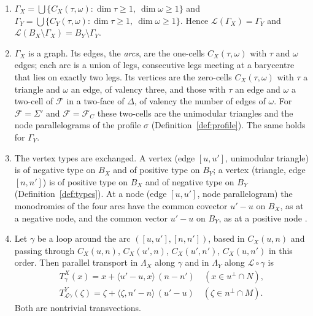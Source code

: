\begin{proposition}\label{prop:L2}
\begin{enumerate}
\item $\Gamma_X=\bigcup\{C_X(\tau,\omega):\dim\tau\ge1,\ \dim\omega\ge1\}$ and
$\Gamma_Y=\bigcup\{C_Y(\tau,\omega):\dim\tau\ge1,\ \dim\omega\ge1\}$. Hence $\mathcal L(\Gamma_X)=\Gamma_Y$ and
$\mathcal L(B_X\setminus\Gamma_X)=B_Y\setminus\Gamma_Y$.
\item $\Gamma_X$ is a graph. Its edges, the \emph{arcs}, are the one-cells $C_X(\tau,\omega)$ with $\tau$ and $\omega$
edges; each arc is a union of legs, consecutive legs meeting at a barycentre that lies on exactly two legs. Its vertices
are the zero-cells $C_X(\tau,\omega)$ with $\tau$ a triangle and $\omega$ an edge, of valency three, and those with
$\tau$ an edge and $\omega$ a two-cell of $\mathcal F$ in a two-face of $\Delta$, of valency the number of edges of
$\omega$. For $\mathcal F=\Sigma'$ and $\mathcal F=\mathcal F_C$ these two-cells are the unimodular triangles and the node
parallelograms of the profile $\sigma$ (Definition~\ref{def:profile}). The same holds for $\Gamma_Y$.
\item The vertex types are exchanged. A vertex (edge $[u,u']$, unimodular triangle) is of negative type on $B_X$ and of
positive type on $B_Y$; a vertex (triangle, edge $[n,n']$) is of positive type on $B_X$ and of negative type on $B_Y$
(Definition~\ref{def:types}). At a node (edge $[u,u']$, node parallelogram) the monodromies of the four arcs have the
common covector $u'-u$ on $B_X$, as at a negative node, and the common vector $u'-u$ on $B_Y$, as at a positive node
\cite[Ex.~6.1, 6.2]{CBM}.
\item Let $\gamma$ be a loop around the arc $([u,u'],[n,n'])$, based in $C_X(u,n)$ and passing through $C_X(u,n)$,
$C_X(u',n)$, $C_X(u',n')$, $C_X(u,n')$ in this order. Then parallel transport in $\Lambda_X$ along $\gamma$ and in
$\Lambda_Y$ along $\mathcal L\circ\gamma$ is
\begin{gather*}
T^X_\gamma(x)=x+\langle u'-u,x\rangle\,(n-n')\quad(x\in u^\perp\cap N),\\
T^Y_{\mathcal L\gamma}(\zeta)=\zeta+\langle\zeta,n'-n\rangle\,(u'-u)\quad(\zeta\in n^\perp\cap M).
\end{gather*}
Both are nontrivial transvections.
\end{enumerate}
\end{proposition}

